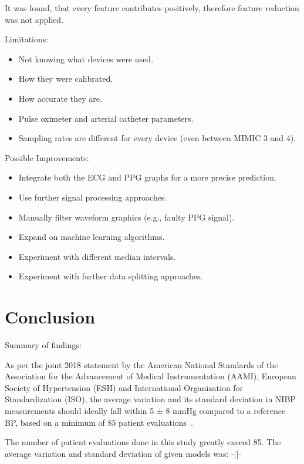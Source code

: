 \documentclass[12pt, bibliography=totoc]{scrartcl}
\begin{document}
    It was found, that every feature contributes positively, therefore feature reduction was not applied.

    Limitations:
    \begin{itemize}
        \item Not knowing what devices were used.
        \item How they were calibrated.
        \item How accurate they are.
        \item Pulse oximeter and arterial catheter parameters.
        \item Sampling rates are different for every device (even between MIMIC 3 and 4).
    \end{itemize}

    Possible Improvements:
    \begin{itemize}
        \item Integrate both the ECG and PPG graphs for a more precise prediction.
        \item Use further signal processing approaches.
        \item Manually filter waveform graphics (e.g., faulty PPG signal).
        \item Expand on machine learning algorithms.
        \item Experiment with different median intervals.
        \item Experiment with further data splitting approaches.
    \end{itemize}


    \section{Conclusion}
    \label{sec:conclusion}

    Summary of findings:

    As per the joint 2018 statement by the American National Standards of the Association for the Advancement of Medical Instrumentation (AAMI), European Society of Hypertension (ESH)
    and International Organization for Standardization (ISO), the average variation and its standard deviation in NIBP measurements should ideally fall within 5 ± 8 mmHg compared to a reference BP,
    based on a minimum of 85 patient evaluations~\cite{stergiouUniversalStandardValidation2018}.

    The number of patient evaluations done in this study greatly exceed 85.
    The average variation and standard deviation of given models was: -||-
\end{document}
